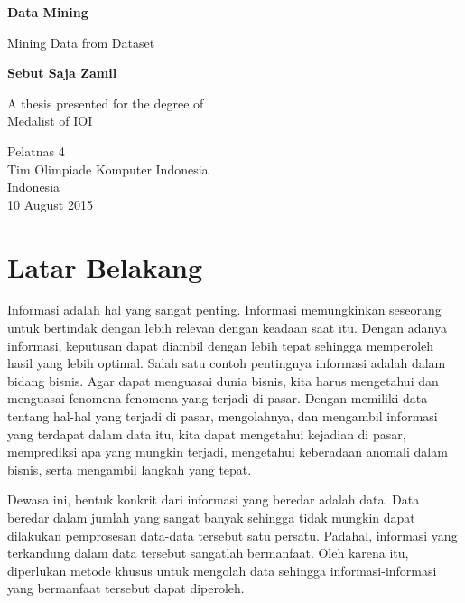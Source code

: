 \documentclass{article}
\begin{document}
\begin{titlepage}

\begin{center}
\vspace*{1cm}

\textbf{Data Mining}

\vspace{0.5cm}
Mining Data from Dataset

\vspace{1.5cm}

\textbf{Sebut Saja Zamil}

\vspace{1.5cm}

\vspace{1.5cm}

A thesis presented for the degree of\\
Medalist of IOI

\vspace{0.8cm}

Pelatnas 4\\
Tim Olimpiade Komputer Indonesia\\
Indonesia\\
10 August 2015

\end{center}
\end{titlepage}

\tableofcontents
\newpage

\section{Latar Belakang}

Informasi adalah hal yang sangat penting. Informasi memungkinkan seseorang untuk bertindak dengan lebih relevan dengan keadaan saat itu. Dengan adanya informasi, keputusan dapat diambil dengan lebih tepat sehingga memperoleh hasil yang lebih optimal. Salah satu contoh pentingnya informasi adalah dalam bidang bisnis. Agar dapat menguasai dunia bisnis, kita harus mengetahui dan menguasai fenomena-fenomena yang terjadi di pasar. Dengan memiliki data tentang hal-hal yang terjadi di pasar, mengolahnya, dan mengambil informasi yang terdapat dalam data itu, kita dapat mengetahui kejadian di pasar, memprediksi apa yang mungkin terjadi, mengetahui keberadaan anomali dalam bisnis, serta mengambil langkah yang tepat.

Dewasa ini, bentuk konkrit dari informasi yang beredar adalah data. Data beredar dalam jumlah yang sangat banyak sehingga tidak mungkin dapat dilakukan pemprosesan data-data tersebut satu persatu. Padahal, informasi yang terkandung dalam data tersebut sangatlah bermanfaat. Oleh karena itu, diperlukan metode khusus untuk mengolah data sehingga informasi-informasi yang bermanfaat tersebut dapat diperoleh.
\end{document}

